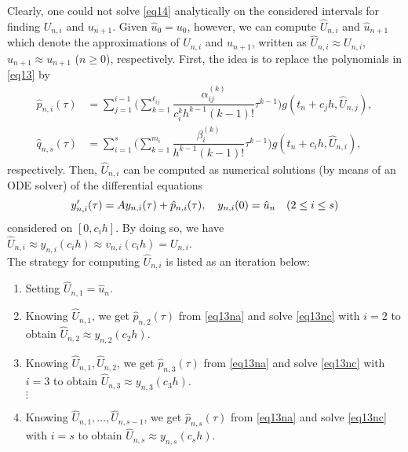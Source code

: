 Clearly, one could not solve  \eqref{eq14} analytically on the considered intervals for finding $U_{n,i}$ and $u_{n+1}$. 
Given $\hat{u}_0=u_0$, however, we can compute $\widehat{U}_{n,i}$ and $\hat{u}_{n+1}$ which denote the approximations  
 of  $ U_{n,i}$ and ${u}_{n+1}$, written as $\widehat{U}_{n,i}  \approx  U_{n,i}$, $\hat{u}_{n+1}  \approx  u_{n+1}$ ($n\geq 0$), respectively.
First, the idea is to replace the polynomials in \eqref{eq13} by 
\begin{subequations} \label{eq13n}
\begin{align}
 \hat{p}_{n,i}(\tau)&= \sum_{j=1}^{i-1} \Big(\sum_{k=1}^{\ell_{ij}}\dfrac{\alpha^{(k)}_{ij}}{c^k_i h^{k-1} (k-1)!}\tau^{k-1}\Big) g(t_n +c_j h, \widehat{U}_{n,j}), \label{eq13na} \\
\hat{q}_{n,s}(\tau) &= \sum_{i=1}^{s} \Big(\sum_{k=1}^{m_i}\dfrac{\beta^{(k)}_{i} }{h^{k-1}(k-1)!}\tau^{k-1} \Big) g(t_n +c_i h, \widehat{U}_{n,i}),  \label{eq13nb} 
\end{align}
\end{subequations}  
respectively. 
Then, $\widehat{U}_{n,i}$ can be computed as numerical solutions (by means of an ODE solver) of the differential equations
\begin{equation} \label{eq13nc} 
y'_{n,i}(\tau)=Ay_{n,i}(\tau) +   \hat{p}_{n,i}(\tau), \q  y_{n,i}(0)=\hat{u}_n \q  (2\leq i\leq s)
\end{equation}
considered on $[0, c_i h]$. By doing so, we have \ $\widehat{U}_{n,i}\approx y_{n,i}(c_i h) \approx v_{n,i}(c_i h)=U_{n,i}$.\\
The strategy for computing  $\widehat{U}_{n,i}$  is listed as an iteration below:
\begin{enumerate}
\item Setting  $\widehat{U}_{n,1}=\hat{u}_n$. 
\item Knowing $\widehat{U}_{n,1}$, we get $\hat{p}_{n,2}(\tau)$  from \eqref{eq13na} and solve \eqref{eq13nc} with $i=2$
 to obtain $\widehat{U}_{n,2}\approx y_{n,2}(c_2 h).$
\item Knowing $\widehat{U}_{n,1}, \widehat{U}_{n,2}$, we get  $\hat{p}_{n,3}(\tau)$  from \eqref{eq13na} and solve \eqref{eq13nc} with $i=3$
 to obtain $\widehat{U}_{n,3}\approx y_{n,3}(c_3 h).$ \\
$\vdots$
\item Knowing $\widehat{U}_{n,1}, \ldots, \widehat{U}_{n,s-1}$, we get $\hat{p}_{n,s}(\tau)$  from \eqref{eq13na} and solve \eqref{eq13nc} with $i=s$
 to obtain $\widehat{U}_{n,s}\approx y_{n,s}(c_s h).$ 
\end{enumerate}
